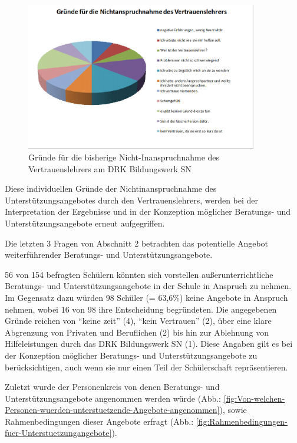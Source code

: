 \begin{figure}[h]
	\centering
		\includegraphics[width=0.9\textwidth]{images/Gruende-fuer-die-Nichtinaspruchnahme-des-Vertrauenslehrers.png}
	\caption{Gründe für die bisherige Nicht-Inanspruchnahme des Vertrauenslehrers am DRK Bildungswerk SN}
	\label{fig:Gruende-fuer-die-Nichtinaspruchnahme-des-Vertrauenslehrers}
\end{figure}

\noindent
Diese individuellen Gründe der Nichtinanspruchnahme des Unterstützungsangebotes durch den Vertrauenslehrers, werden bei der Interpretation der Ergebnisse und in der Konzeption möglicher Beratungs- und Unterstützungsangebote erneut aufgegriffen.

Die letzten 3 Fragen von Abschnitt 2 betrachten das potentielle Angebot weiterführender Beratungs- und Unterstützungsangebote. 

56 von 154 befragten Schülern könnten sich vorstellen außerunterrichtliche Beratungs- und Unterstützungsangebote in der Schule in Anspruch zu nehmen. Im Gegensatz dazu würden 98 Schüler (= 63,6\%) keine Angebote in Anspruch nehmen, wobei 16 von 98 ihre Entscheidung begründeten. Die angegebenen Gründe reichen von "`keine  zeit"' (4), "`kein Vertrauen"' (2), über eine klare Abgrenzung von Privaten und Beruflichen (2) bis hin zur Ablehnung von Hilfeleistungen durch das DRK Bildungswerk SN (1). Diese Angaben gilt es bei der Konzeption möglicher Beratungs- und Unterstützungsangebote zu berücksichtigen, auch wenn sie nur einen Teil der Schülerschaft repräsentieren.

Zuletzt wurde der Personenkreis von denen Beratungs- und Unterstützungsangebote angenommen werden würde (Abb.: \ref{fig:Von-welchen-Personen-wuerden-unterstuetzende-Angebote-angenommen}), sowie Rahmenbedingungen dieser Angebote erfragt (Abb.: \ref{fig:Rahmenbedingungen-fuer-Unterstuetzungangebote}). 

